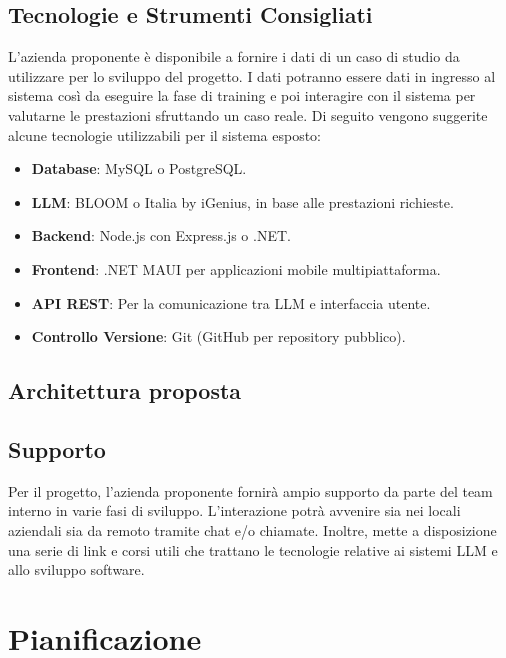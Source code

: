 \documentclass{article}
\begin{document}
    \subsection{Tecnologie e Strumenti Consigliati}
    L’azienda proponente è disponibile a fornire i dati di un caso di studio da utilizzare
    per lo sviluppo del progetto. I dati potranno essere dati in ingresso al sistema così da eseguire la fase di
    training e poi interagire con il sistema per valutarne le prestazioni sfruttando un caso reale.
    Di seguito vengono suggerite alcune tecnologie utilizzabili per il sistema esposto:
    \begin{itemize}
        \item \textbf{Database}: MySQL o PostgreSQL.
        \item \textbf{LLM}: BLOOM o Italia by iGenius, in base alle prestazioni richieste.
        \item \textbf{Backend}: Node.js con Express.js o .NET.
        \item \textbf{Frontend}: .NET MAUI per applicazioni mobile multipiattaforma.
        \item \textbf{API REST}: Per la comunicazione tra LLM e interfaccia utente.
        \item \textbf{Controllo Versione}: Git (GitHub per repository pubblico).
    \end{itemize}

    \subsection{Architettura proposta}

    \subsection{Supporto}
    Per il progetto, l’azienda proponente fornirà ampio supporto da parte del team interno in varie fasi
    di sviluppo. L’interazione potrà avvenire sia nei locali aziendali sia da remoto tramite chat e/o chiamate.
    Inoltre, mette a disposizione una serie di link e corsi utili che trattano le tecnologie relative ai sistemi
    LLM e allo sviluppo software.




\newpage
\section{Pianificazione}
\end{document}
